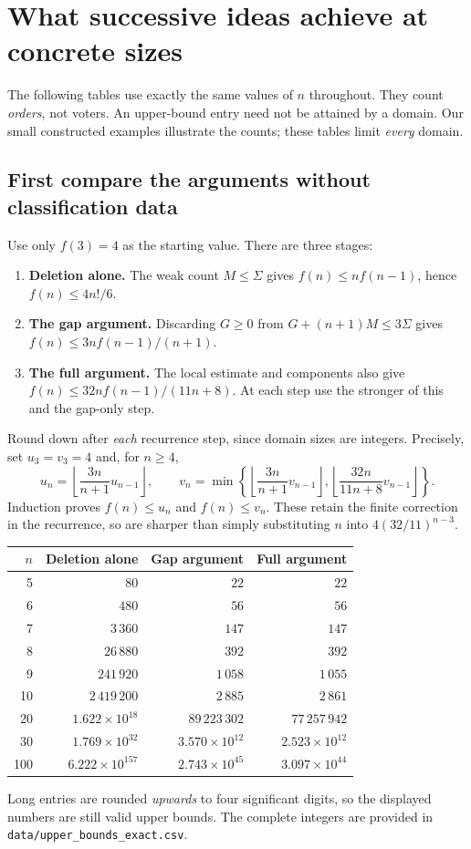 \section{What successive ideas achieve at concrete sizes}\label{sec:numerical}
The following tables use exactly the same values of \(n\) throughout.
They count \emph{orders}, not voters. An upper-bound entry need not
be attained by a domain. Our small constructed examples illustrate
the counts; these tables limit \emph{every} domain.

\subsection{First compare the arguments without classification data}
Use only \(f(3)=4\) as the starting value. There are three stages:
\begin{enumerate}[label=\arabic*.]
\item \textbf{Deletion alone.} The weak count \(M\leq\Sigma\)
gives \(f(n)\leq nf(n-1)\), hence \(f(n)\leq4n!/6\).
\item \textbf{The gap argument.} Discarding \(G\geq0\) from
\(G+(n+1)M\leq3\Sigma\) gives
\(f(n)\leq3n f(n-1)/(n+1)\).
\item \textbf{The full argument.} The local estimate and components
also give \(f(n)\leq32n f(n-1)/(11n+8)\). At each step use
the stronger of this and the gap-only step.
\end{enumerate}
Round down after \emph{each} recurrence step, since domain sizes
are integers. Precisely, set \(u_3=v_3=4\) and, for \(n\geq4\),
\[
 u_n=\left\lfloor\frac{3n}{n+1}u_{n-1}\right\rfloor,\qquad
 v_n=\min\!\left\{
 \left\lfloor\frac{3n}{n+1}v_{n-1}\right\rfloor,
 \left\lfloor\frac{32n}{11n+8}v_{n-1}\right\rfloor\right\}.
\]
Induction proves \(f(n)\leq u_n\) and \(f(n)\leq v_n\).
These retain the finite correction in the recurrence, so are sharper
than simply substituting \(n\) into \(4(32/11)^{n-3}\).

\begin{center}\small
\renewcommand{\arraystretch}{1.18}
\begin{tabular}{@{}rrrr@{}}\toprule
\(n\)&Deletion alone&Gap argument&Full argument\\\midrule
5&$80$&$22$&$22$\\
6&$480$&$56$&$56$\\
7&$3\,360$&$147$&$147$\\
8&$26\,880$&$392$&$392$\\
9&$241\,920$&$1\,058$&$1\,055$\\
10&$2\,419\,200$&$2\,885$&$2\,861$\\
20&$1.622\times10^{18}$&$89\,223\,302$&$77\,257\,942$\\
30&$1.769\times10^{32}$&$3.570\times10^{12}$&$2.523\times10^{12}$\\
100&$6.222\times10^{157}$&$2.743\times10^{45}$&$3.097\times10^{44}$\\
\bottomrule\end{tabular}
\end{center}
Long entries are rounded \emph{upwards} to four significant digits,
so the displayed numbers are still valid upper bounds. The complete
integers are provided in \texttt{data/upper\_bounds\_exact.csv}.

